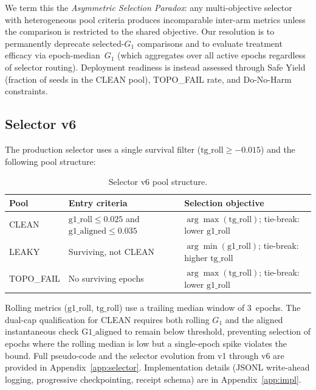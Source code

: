 We term this the \emph{Asymmetric Selection Paradox}: any multi-objective selector with heterogeneous pool criteria produces incomparable inter-arm metrics unless the comparison is restricted to the shared objective. Our resolution is to permanently deprecate selected-$G_1$ comparisons and to evaluate treatment efficacy via epoch-median~$G_1$ (which aggregates over all active epochs regardless of selector routing). Deployment readiness is instead assessed through Safe Yield (fraction of seeds in the CLEAN pool), TOPO\_FAIL rate, and Do-No-Harm constraints.

\subsection{Selector v6}

The production selector uses a single survival filter ($\mathrm{tg\_roll} \geq -0.015$) and the following pool structure:

\begin{table}
\caption{Selector v6 pool structure.}
\renewcommand{\arraystretch}{1.25}
\begin{ruledtabular}
\begin{tabular}{lll}
Pool & Entry criteria & Selection objective \\
\hline
CLEAN & $\mathrm{g1\_roll} \leq 0.025$ and $\mathrm{g1\_aligned} \leq 0.035$ & $\arg\max(\mathrm{tg\_roll})$; tie-break: lower $\mathrm{g1\_roll}$ \\[2pt]
LEAKY & Surviving, not CLEAN & $\arg\min(\mathrm{g1\_roll})$; tie-break: higher $\mathrm{tg\_roll}$ \\[2pt]
TOPO\_FAIL & No surviving epochs & $\arg\max(\mathrm{tg\_roll})$; tie-break: lower $\mathrm{g1\_roll}$ \\
\end{tabular}
\end{ruledtabular}
\renewcommand{\arraystretch}{1.0}
\end{table}

Rolling metrics ($\mathrm{g1\_roll}$, $\mathrm{tg\_roll}$) use a trailing median window of 3~epochs. The dual-cap qualification for CLEAN requires both rolling $G_1$ and the aligned instantaneous check $\mathrm{G1\_aligned}$ to remain below threshold, preventing selection of epochs where the rolling median is low but a single-epoch spike violates the bound. Full pseudo-code and the selector evolution from v1 through v6 are provided in Appendix~\ref{app:selector}. Implementation details (JSONL write-ahead logging, progressive checkpointing, receipt schema) are in Appendix~\ref{app:impl}.

